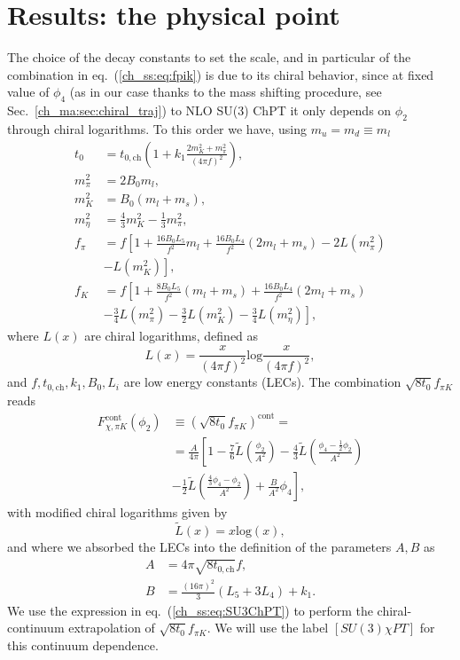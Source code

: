 \section{Results: the physical point}
\label{ch_ss:sec:Results}

The choice of the decay constants to set the scale, and in particular of the combination in eq.~(\ref{ch_ss:eq:fpik}) is due to its chiral behavior, since at fixed value of $\phi_4$ (as in our case thanks to the mass shifting procedure, see Sec.~\ref{ch_ma:sec:chiral_traj}) to NLO SU(3) ChPT it only depends on $\phi_2$ through chiral logarithms. To this order we have, using $m_u=m_d\equiv m_l$~\citep{FLAG16,Bar:2013ora}
\begin{align}
t_0&=t_{0,\textrm{ch}}\left(1+k_1\frac{2m_K^2+m_{\pi}^2}{(4\pi f)^2}\right), \\
m_{\pi}^2&=2B_0m_l, \\
m_K^2&=B_0(m_l+m_s), \\
m_{\eta}^2&=\frac{4}{3}m_K^2-\frac{1}{3}m_{\pi}^2, \\
f_{\pi}&=f\left[1+\frac{16B_0L_5}{f^2}m_l+\frac{16B_0L_4}{f^2}(2m_l+m_s)-2L(m_{\pi}^2)\right. \\
&\left.-L(m_K^2)\right], \\
f_K&=f\left[1+\frac{8B_0L_5}{f^2}(m_l+m_s)+\frac{16B_0L_4}{f^2}(2m_l+m_s)\right. \\
&\left.-\frac{3}{4}L(m_{\pi}^2)-\frac{3}{2}L(m_K^2)-\frac{3}{4}L(m_{\eta}^2)\right],
\end{align}
where $L(x)$ are chiral logarithms, defined as
\begin{equation}
L(x)=\frac{x}{(4\pi f)^2}\textrm{log}\frac{x}{(4\pi f)^2},
\end{equation}
and $f,t_{0,\textrm{ch}},k_1,B_0,L_i$ are low energy constants (LECs). The combination $\sqrt{8t_0}f_{\pi K}$ reads
\begin{align}
\label{ch_ss:eq:SU3ChPT}
F_{\chi,\pi K}^{\textrm{cont}}(\phi_2)&\equiv\left(\sqrt{8t_0}f_{\pi K}\right)^{\textrm{cont}}=\\
&=\frac{A}{4\pi}\left[1-\frac{7}{6}\tilde{L}\left(\frac{\phi_2}{A^2}\right)-\frac{4}{3}\tilde{L}\left(\frac{\phi_4-\frac{1}{2}\phi_2}{A^2}\right)\right. \\
&\left.-\frac{1}{2}\tilde{L}\left(\frac{\frac{4}{3}\phi_4-\phi_2}{A^2}\right)+\frac{B}{A^2}\phi_4\right],
\end{align}
with modified chiral logarithms given by
\begin{equation}
\label{ch_ss:eq:log}
\tilde{L}(x)=x{\textrm{log}}\left(x\right),
\end{equation}
and where we absorbed the LECs into the definition of the parameters $A,B$ as
\begin{align}
A&=4\pi\sqrt{8t_{0,\textrm{ch}}}f, \\
B&=\frac{(16\pi)^2}{3}(L_5+3L_4)+k_1.
\end{align} 
We use the expression in eq.~(\ref{ch_ss:eq:SU3ChPT}) to perform the chiral-continuum extrapolation of $\sqrt{8t_0}f_{\pi K}$. We will use the label $[SU(3)\chi PT]$ for this continuum dependence. 

